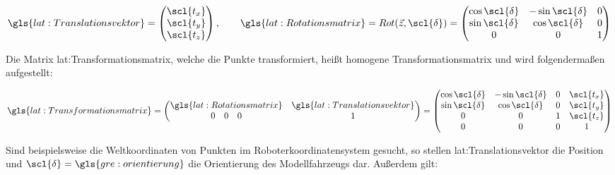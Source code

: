 \begin{equation}
\gls{lat:Translationsvektor} = 
\begin{pmatrix}
\scl{t_x} 	\\
\scl{t_y} 	\\
\scl{t_z}     	\\
\end{pmatrix}
, \qquad
\gls{lat:Rotationsmatrix} = Rot(\vec{z},\scl{\delta}) = 
\begin{pmatrix}
\cos{\scl{\delta}} & -\sin{\scl{\delta}} & {0} 	\\
\sin{\scl{\delta}} & \cos{\scl{\delta}} & {0} 	\\
{0} & {0} & {1} 				    	\\
\end{pmatrix}
\end{equation} 		


Die Matrix \gls{lat:Transformationsmatrix}, welche die Punkte  transformiert, heißt homogene Transformationsmatrix und wird folgendermaßen aufgestellt:

\begin{equation}
\gls{lat:Transformationsmatrix} = 
\begin{pmatrix}
\gls{lat:Rotationsmatrix} &  \gls{lat:Translationsvektor}	\\
0 \quad 0 \quad 0 & 1 	\\
\end{pmatrix}
=
\begin{pmatrix}
\cos{\scl{\delta}} & -\sin{\scl{\delta}} & {0} & \scl{t_x} 	\\
\sin{\scl{\delta}} & \cos{\scl{\delta}} & {0} & \scl{t_y} 	\\
{0} & {0} & {1} & \scl{t_z} 				    	\\
0 & 0 & 0 & 1 						\\
\end{pmatrix}
\end{equation}

Sind beispielsweise die Weltkoordinaten von Punkten im Roboterkoordinatensystem gesucht, so stellen \gls{lat:Translationsvektor} die Position und \( \scl{\delta} = \gls{gre:orientierung} \) die Orientierung des Modellfahrzeugs dar. Außerdem gilt: 

